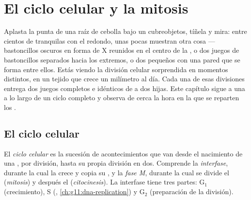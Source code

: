 \chapter{El ciclo celular y la mitosis}\label{ch:g11:cell-cycle-mitosis}

Aplasta la punta de una raíz de cebolla bajo un cubreobjetos, tíñela y
mira: entre cientos de  tranquilas con el  redondo, unas
pocas muestran otra cosa --- bastoncillos oscuros en forma de X
reunidos en el centro de la , o dos juegos de bastoncillos
separados hacia los extremos, o dos  pequeños con una pared que
se forma entre ellos. Estás viendo la división celular sorprendida en
momentos distintos, en un tejido que crece un milímetro al día. Cada
una de esas divisiones entrega dos juegos completos e idénticos de
 a dos  hijas. Este capítulo sigue a una  a lo
largo de un ciclo completo y observa de cerca la hora en la que se
reparten los .

\section{El ciclo celular}

\begin{definition}\label{def:g11:cell-cycle-mitosis:cycle}
El \emph{ciclo celular} es la sucesión de
acontecimientos que van desde el nacimiento de una , por
división, hasta su propia división en dos. Comprende la
\emph{interfase}, durante la cual la  crece y copia su , y la
\emph{fase M}, durante la cual se divide el 
(\emph{mitosis}) y después el 
(\emph{citocinesis}). La interfase tiene tres partes: $\mathrm{G_1}$
(crecimiento), S (, \cref{ch:g11:dna-replication}) y
$\mathrm{G_2}$ (preparación de la división).
\end{definition}

